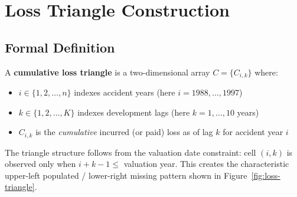 \section{Loss Triangle Construction}
\label{sec:ins-triangle}


\subsection{Formal Definition}

A \textbf{cumulative loss triangle} is a two-dimensional array
$C = \{C_{i,k}\}$ where:
\begin{itemize}
  \item $i \in \{1, 2, \ldots, n\}$ indexes accident years
    (here $i = 1988, \ldots, 1997$)
  \item $k \in \{1, 2, \ldots, K\}$ indexes development lags
    (here $k = 1, \ldots, 10$ years)
  \item $C_{i,k}$ is the \emph{cumulative} incurred (or paid) loss
    as of lag $k$ for accident year $i$
\end{itemize}

The triangle structure follows from the valuation date constraint:
cell $(i, k)$ is observed only when $i + k - 1 \leq$ valuation year.
This creates the characteristic upper-left populated / lower-right
missing pattern shown in Figure~\ref{fig:loss-triangle}.

